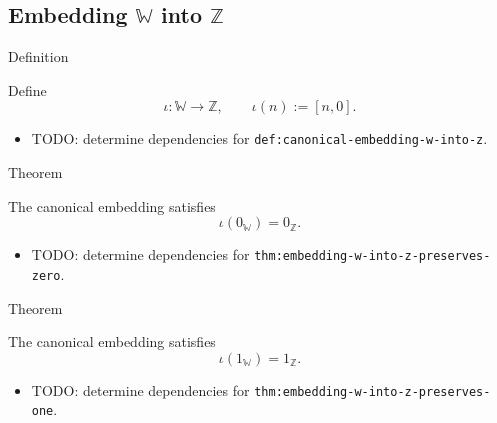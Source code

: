 \subsection*{Embedding $\mathbb{W}$ into $\mathbb{Z}$}

\begin{definitionbox}{Definition}
\begin{definition}
\label{def:canonical-embedding-w-into-z}
Define
\[
\iota:\mathbb{W}\to\mathbb{Z},
\qquad
\iota(n):=[n,0].
\]
\end{definition}
\end{definitionbox}

\begin{dependencies}
\begin{itemize}
  \item TODO: determine dependencies for \texttt{def:canonical-embedding-w-into-z}.
\end{itemize}
\end{dependencies}

\begin{theorembox}{Theorem}
\begin{theorem}
\label{thm:embedding-w-into-z-preserves-zero}
The canonical embedding satisfies
\[
\iota(0_{\mathbb{W}})=0_{\mathbb{Z}}.
\]
\end{theorem}
\end{theorembox}

\begin{dependencies}
\begin{itemize}
  \item TODO: determine dependencies for \texttt{thm:embedding-w-into-z-preserves-zero}.
\end{itemize}
\end{dependencies}

\begin{theorembox}{Theorem}
\begin{theorem}
\label{thm:embedding-w-into-z-preserves-one}
The canonical embedding satisfies
\[
\iota(1_{\mathbb{W}})=1_{\mathbb{Z}}.
\]
\end{theorem}
\end{theorembox}

\begin{dependencies}
\begin{itemize}
  \item TODO: determine dependencies for \texttt{thm:embedding-w-into-z-preserves-one}.
\end{itemize}
\end{dependencies}


